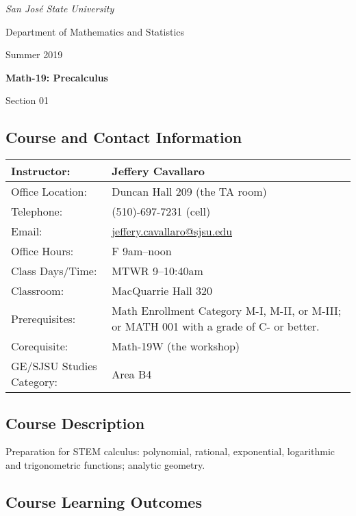 \documentclass[letterpaper,12pt,fleqn]{article}
\begin{document}
\begin{center}
  \emph{San Jos\'{e} State University}

  Department of Mathematics and Statistics

  {\large Summer 2019}
  
  \begin{Large}
    \bfseries
    Math-19: Precalculus

    Section 01
  \end{Large}
\end{center}

\vspace{0.25in}

\subsection*{Course and Contact Information}

\begin{tabular}{|p{2in}|p{4.5in}|}
  \hline
  Instructor: & Jeffery Cavallaro \\
  \hline
  Office Location: & Duncan Hall 209 (the TA room) \\
  \hline
  Telephone: & (510)-697-7231 (cell) \\
  \hline
  Email: & \url{jeffery.cavallaro@sjsu.edu} \\
  \hline
  Office Hours: & F 9am--noon \\
  \hline
  Class Days/Time: & MTWR 9--10:40am \\
  \hline
  Classroom: & MacQuarrie Hall 320 \\
  \hline
  Prerequisites: & Math Enrollment Category M-I, M-II, or M-III; or MATH 001 with a grade of C- or better. \\
  \hline
  Corequisite: & Math-19W (the workshop) \\
  \hline
  GE/SJSU Studies Category: & Area B4 \\
  \hline
\end{tabular}

\subsection*{Course Description}

Preparation for STEM calculus: polynomial, rational, exponential, logarithmic and trigonometric functions; analytic geometry.

\subsection*{Course Learning Outcomes}
\end{document}
